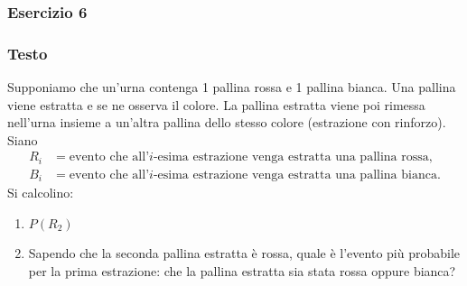 \subsubsection{Esercizio 6}
\subsubsection{Testo}
Supponiamo che un’urna contenga 1 pallina rossa e 1 pallina bianca. Una pallina viene estratta e se ne osserva il colore. La pallina estratta viene poi rimessa nell’urna insieme a un’altra pallina dello stesso colore (estrazione con rinforzo). Siano
\[
\begin{aligned}
    R_i &= \text{evento che all'}i\text{-esima estrazione venga estratta una pallina rossa,}\\
    B_i &= \text{evento che all'}i\text{-esima estrazione venga estratta una pallina bianca.}
\end{aligned}
\]
Si calcolino:
\begin{enumerate}[label=(\arabic*)]
    \item \(P(R_2)\)
    \item Sapendo che la seconda pallina estratta è rossa, quale è l’evento più probabile per la prima estrazione: che la pallina estratta sia stata rossa oppure bianca?
\end{enumerate}

